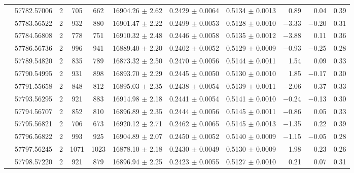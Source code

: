 \documentclass[a4paper,fleqn,usenatbib]{mnras}
\begin{document}
\begin{table*}
\begin{threeparttable}
{\begin{tabular}{c c c c c c c c r r c}
 & 57782.57006  & 2 &  705  & 662 & 16904.26 $\pm$ 2.62  &   0.2429 $\pm$ 0.0064  &   0.5134 $\pm$ 0.0013  & 0.89      &  0.04        & 0.39\\  
 & 57783.56522  & 2 &  932  & 880 & 16901.47 $\pm$ 2.22  &   0.2499 $\pm$ 0.0053  &   0.5128 $\pm$ 0.0010  &$-$3.33  & $-$0.20   &  0.31\\  
 & 57784.56808  & 2 &  778  & 751 & 16910.32 $\pm$ 2.48  &   0.2446 $\pm$ 0.0058  &   0.5135 $\pm$ 0.0012  &$-$3.88  &  0.11        & 0.36\\  
 & 57786.56736  & 2 &  996  & 941 & 16889.40 $\pm$ 2.20  &   0.2402 $\pm$ 0.0052  &   0.5129 $\pm$ 0.0009  &$-$0.93  & $-$0.25   &  0.28\\  
 & 57789.54820  & 2 &  835  & 789 & 16873.32 $\pm$ 2.50  &   0.2470 $\pm$ 0.0056  &   0.5144 $\pm$ 0.0011  &  1.54     &  0.09       &   0.33\\  
 & 57790.54995  & 2 &  931  & 898 & 16893.70 $\pm$ 2.29  &   0.2445 $\pm$ 0.0050  &   0.5130 $\pm$ 0.0010  & 1.85      & $-$0.17  &   0.30\\  
 & 57791.55658  & 2 &  848  & 812 & 16895.03 $\pm$ 2.35  &   0.2438 $\pm$ 0.0054  &   0.5139 $\pm$ 0.0011  &$-$2.06  &  0.37       &  0.33\\  
 & 57793.56295  & 2 &  921  & 883 & 16914.98 $\pm$ 2.18  &   0.2441 $\pm$ 0.0054  &   0.5141 $\pm$ 0.0010  &$-$0.24  & $-$0.13  &   0.30\\  
 & 57794.56707  & 2 &  852  & 810 & 16896.89 $\pm$ 2.35  &   0.2444 $\pm$ 0.0056  &   0.5145 $\pm$ 0.0011  &$-$0.86  &  0.05      &   0.33\\  
 & 57795.56821  & 2 &  706  & 673 & 16920.12 $\pm$ 2.71  &   0.2462 $\pm$ 0.0065  &   0.5145 $\pm$ 0.0013  &$-$1.35  &  0.22      &   0.39\\  
 & 57796.56822  & 2 &  993  & 925 & 16904.89 $\pm$ 2.07  &   0.2450 $\pm$ 0.0052  &   0.5140 $\pm$ 0.0009  &$-$1.15  & $-$0.05   &  0.28\\  
 & 57797.56245  & 2 & 1071 &1023 &  16878.10 $\pm$ 2.18  &   0.2430 $\pm$ 0.0049  &   0.5130 $\pm$ 0.0009  & 1.98     &  0.23       &  0.26\\
 & 57798.57220  & 2 &  921  & 879 & 16896.94 $\pm$ 2.25  &   0.2423 $\pm$ 0.0055  &   0.5127 $\pm$ 0.0010  & 0.21      &  0.07       &  0.31\\[1pt]

\hline                  
\end{tabular}}
\end{threeparttable}
\end{table*}
\end{document}

